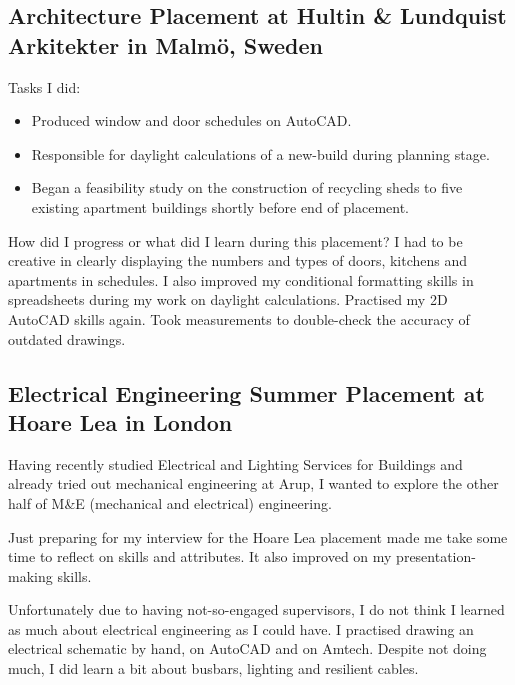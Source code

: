 
\subsection{Architecture Placement at Hultin \& Lundquist Arkitekter in Malmö, Sweden}

Tasks I did:
\begin{itemize}
	\item Produced window and door schedules on AutoCAD.
	\item Responsible for daylight calculations of a new-build during planning stage.
	\item Began a feasibility study on the construction of recycling sheds to five existing apartment buildings shortly before end of placement.
\end{itemize}

How did I progress or what did I learn during this placement?
I had to be creative in clearly displaying the numbers and types of doors, kitchens and apartments in schedules.
I also improved my conditional formatting skills in spreadsheets during my work on daylight calculations.
Practised my 2D AutoCAD skills again.
Took measurements to double-check the accuracy of outdated drawings.



\subsection{Electrical Engineering Summer Placement at Hoare Lea in London}

Having recently studied Electrical and Lighting Services for Buildings and already tried out mechanical engineering at Arup, I wanted to explore the other half of M\&E (mechanical and electrical) engineering.

Just preparing for my interview for the Hoare Lea placement made me take some time to reflect on skills and attributes.
It also improved on my presentation-making skills.

Unfortunately due to having not-so-engaged supervisors, I do not think I learned as much about electrical engineering as I could have.
I practised drawing an electrical schematic by hand, on AutoCAD and on Amtech.
Despite not doing much, I did learn a bit about busbars, lighting and resilient cables.

